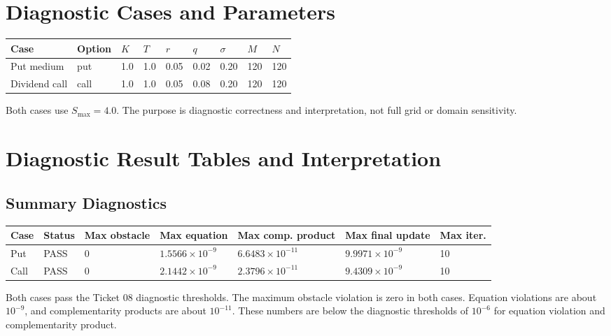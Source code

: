 \documentclass[11pt,a4paper]{article}
\begin{document}
\section{Diagnostic Cases and Parameters}

\begin{longtable}{@{}L{0.16\textwidth}L{0.10\textwidth}L{0.07\textwidth}L{0.07\textwidth}L{0.07\textwidth}L{0.07\textwidth}L{0.09\textwidth}L{0.07\textwidth}L{0.07\textwidth}@{}}
\toprule
Case & Option & \(K\) & \(T\) & \(r\) & \(q\) & \(\sigma\) & \(M\) & \(N\) \\
\midrule
\endhead
Put medium & put & 1.0 & 1.0 & 0.05 & 0.02 & 0.20 & 120 & 120 \\
Dividend call & call & 1.0 & 1.0 & 0.05 & 0.08 & 0.20 & 120 & 120 \\
\bottomrule
\end{longtable}

Both cases use \(S_{\max}=4.0\). The purpose is diagnostic correctness and interpretation, not
full grid or domain sensitivity.

\section{Diagnostic Result Tables and Interpretation}

\subsection{Summary Diagnostics}

{\footnotesize
\setlength{\tabcolsep}{3pt}
\begin{longtable}{@{}L{0.12\textwidth}L{0.07\textwidth}L{0.10\textwidth}L{0.10\textwidth}L{0.11\textwidth}L{0.11\textwidth}L{0.08\textwidth}@{}}
\toprule
Case & Status & Max obstacle & Max equation & Max comp. product & Max final update & Max iter. \\
\midrule
\endhead
Put & PASS & 0 & \(1.5566\times10^{-9}\) & \(6.6483\times10^{-11}\) & \(9.9971\times10^{-9}\) & 10 \\
Call & PASS & 0 & \(2.1442\times10^{-9}\) & \(2.3796\times10^{-11}\) & \(9.4309\times10^{-9}\) & 10 \\
\bottomrule
\end{longtable}
}

Both cases pass the Ticket 08 diagnostic thresholds. The maximum obstacle violation is zero in
both cases. Equation violations are about \(10^{-9}\), and complementarity products are about
\(10^{-11}\). These numbers are below the diagnostic thresholds of \(10^{-6}\) for equation
violation and complementarity product.
\end{document}
